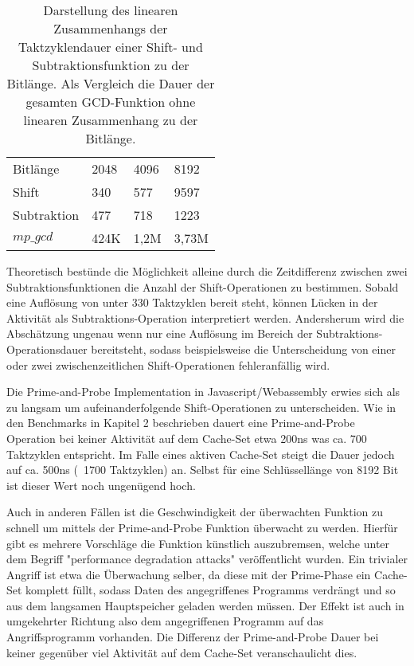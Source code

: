 \begin{table}[h]
\label{tbl:ShiftSubCycles}
\caption{Darstellung des linearen Zusammenhangs der Taktzyklendauer einer Shift- und Subtraktionsfunktion zu der Bitlänge. Als Vergleich die Dauer der gesamten GCD-Funktion ohne linearen Zusammenhang zu der Bitlänge. }
\begin{tabular}{llll}
Bitlänge    & 2048 & 4096 & 8192 \\
Shift       & 340  & 577  & 9597 \\
Subtraktion & 477  & 718  & 1223 \\
$mp\_gcd$    & 424K & 1,2M & 3,73M
\end{tabular}
\end{table}

Theoretisch bestünde die Möglichkeit alleine durch die Zeitdifferenz zwischen zwei Subtraktionsfunktionen die Anzahl der Shift-Operationen zu bestimmen.
Sobald eine Auflösung von unter 330 Taktzyklen bereit steht, können Lücken in der Aktivität als Subtraktions-Operation interpretiert werden.
Andersherum wird die Abschätzung ungenau wenn nur eine Auflösung im Bereich der Subtraktions-Operationsdauer bereitsteht, sodass beispielsweise die Unterscheidung von einer oder zwei zwischenzeitlichen Shift-Operationen fehleranfällig wird.

Die Prime-and-Probe Implementation in Javascript/Webassembly erwies sich als zu langsam um aufeinanderfolgende Shift-Operationen zu unterscheiden.
Wie in den Benchmarks in Kapitel 2 beschrieben dauert eine Prime-and-Probe Operation bei keiner Aktivität auf dem Cache-Set etwa 200ns was ca. 700 Taktzyklen entspricht.
Im Falle eines aktiven Cache-Set steigt die Dauer jedoch auf ca. 500ns (~1700 Taktzyklen) an.
Selbst für eine Schlüssellänge von 8192 Bit ist dieser Wert noch ungenügend hoch.

Auch in anderen Fällen ist die Geschwindigkeit der überwachten Funktion zu schnell um mittels der Prime-and-Probe Funktion überwacht zu werden.
Hierfür gibt es mehrere Vorschläge die Funktion künstlich auszubremsen, welche unter dem Begriff "performance degradation attacks" veröffentlicht wurden.
Ein trivialer Angriff ist etwa die Überwachung selber, da diese mit der Prime-Phase ein Cache-Set komplett füllt, sodass Daten des angegriffenes Programms verdrängt und so aus dem langsamen Hauptspeicher geladen werden müssen.
Der Effekt ist auch in umgekehrter Richtung also dem angegriffenen Programm auf das Angriffsprogramm vorhanden.
Die Differenz der Prime-and-Probe Dauer bei keiner gegenüber viel Aktivität auf dem Cache-Set veranschaulicht dies.

